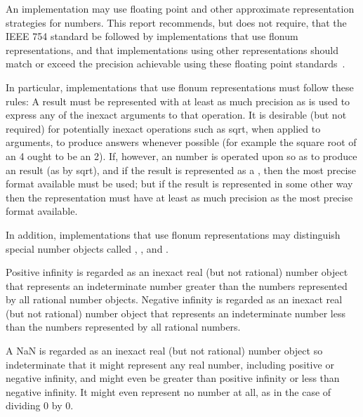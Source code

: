 \vest An implementation may use floating point and other approximate 
representation strategies for  numbers.
%
%
This report recommends, but does not require, that the IEEE 754
standard be followed by implementations that use
flonum representations, and that implementations using
other representations should match or exceed the precision achievable
using these floating point standards~\cite{IEEE}.

\vest In particular, implementations that use flonum representations
must follow these rules: A  result
must be represented with at least as much precision as is used to express any of
the inexact arguments to that operation.  It is desirable (but not required) for
potentially inexact operations such as {\cf sqrt}, when applied to 
arguments, to produce  answers whenever possible (for example the
square root of an  4 ought to be an  2).
If, however, an
 number is operated upon so as to produce an  result
(as by {\cf sqrt}), and if the result is represented as a , then
the most precise  format available must be used; but if the result
is represented in some other way then the representation must have at least as
much precision as the most precise  format available.

In addition, implementations that use flonum representations may
distinguish special number objects called ,
, and .

Positive infinity is regarded as an inexact real (but not rational)
number object that represents an indeterminate number greater than the
numbers represented by all rational number objects. Negative infinity
is regarded as an inexact real (but not rational) number object that
represents an indeterminate number less than the numbers represented
by all rational numbers.

A NaN is regarded as an inexact real (but not rational) number object
so indeterminate that it might represent any real number, including
positive or negative infinity, and might even be greater than positive
infinity or less than negative infinity.
It might even represent no number at all, as in the case of dividing
0 by 0.

